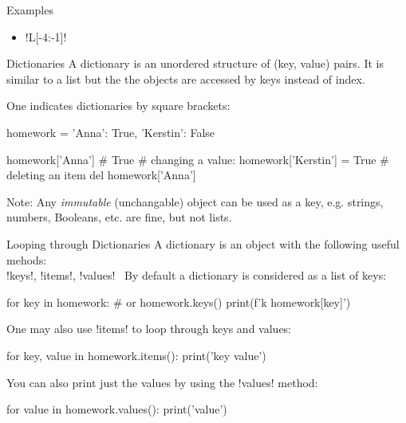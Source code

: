 \documentclass[hyperref={pdfpagelabels=false},table,handout]{beamer}
\begin{document}
\begin{frame}[fragile]{Examples}
\begin{itemize}
\item \pyth!L[-4:-1]! \hfill
{}
\end{itemize}
\end{frame}



\begin{frame}[fragile]{Dictionaries}
A dictionary is an unordered structure of (key, value) pairs.
It is similar to a list but the the objects are accessed by \alert{keys} instead of \alert{index}.

\vfill

One indicates dictionaries by square brackets:

\begin{python}
homework = {'Anna': True, 'Kerstin': False}

homework['Anna'] # True
# changing a value:
homework['Kerstin'] = True
# deleting an item
del homework['Anna']
\end{python}
\vfill
\alert{Note:} Any \emph{immutable} (unchangable) object can be used as a key, e.g. strings, numbers, Booleans, etc. are fine, but not lists.
\vfill

\end{frame}

\begin{frame}[fragile]{Looping through Dictionaries}
A dictionary is an object with the following useful mehods:\\
\vfill
 \hfill \pyth!keys!, \pyth!items!, \pyth!values! \hfill \,
\vfill
By default a dictionary is considered as a list of \alert{keys}:
\begin{python}
for key in homework:  # or homework.keys()
  print(f'{k} {homework[key]}')
\end{python}

\pause
One may also use \pyth!items! to loop through keys and values:
\begin{python}
for key, value in homework.items():
  print('{key} {value}')
\end{python}

\pause
You can also print just the values by using the \pyth!values! method:
\begin{python}
for value in homework.values():
  print('{value}')
\end{python}

\end{frame}
\end{document}
